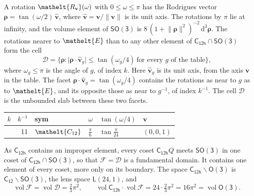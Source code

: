 \documentclass[10pt,a4paper]{article}
\numberwithin{equation}{section}
\newcommand{\eltfont}[1]{{\let\sigma\eltsigma\mathelt{#1}}}
\newcommand{\grp}[1]{\mathsf{#1}}
\newcommand{\cls}[1]{\eltfont{#1}}
\newcommand{\elt}[1]{\eltfont{#1}}
\newcommand{\dirvec}[3]{(#1, #2, #3)}
\newcommand{\unitaxis}{\hat{\mathbf{v}}}
\newcommand{\vv}{\mathbf{v}}
\newcommand{\diff}{\mathrm{d}}
\newcommand{\vol}{\operatorname{vol}}
\newcommand{\rodrigues}{\boldsymbol{\rho}}
\newcommand{\fcell}{\mathcal{D}}
\newcommand{\fdomain}{\mathcal{F}}
\newcommand{\lensspace}[2]{\mathsf{L}(#1, #2)}
\begin{document}
\leavevmode\label{n:vector.rodrigues}\label{n:vector.unitaxis}A rotation $\elt{R_{\vv}}(\omega)$ with $0 \le \omega \le \pi$ has the Rodrigues vector $\rodrigues = \tan(\omega/2)\,\unitaxis$, where $\unitaxis = \vv/\lVert\vv\rVert$ is its unit axis. The rotations by $\pi$ lie at infinity, and the volume element of \href{SO3.pdf}{$\grp{SO(3)}$} is $8\,(1 + \lVert\rodrigues\rVert^2)^{-2}\,\diff^3\rodrigues$.
\leavevmode\label{n:set.cell}The rotations nearer to $\elt{E}$ than to any other element of $\grp{C_{12h}} \cap \grp{SO(3)}$ form the cell
\begin{equation}\label{e:cell}\fcell = \bigl\{\rodrigues : \lvert\rodrigues\cdot\unitaxis_g\rvert \le \tan(\omega_g/4)\ \text{for every $g$ of the table}\bigr\},\end{equation}
where $\omega_g \le \pi$ is the angle of $g$, of index $k$. Here $\unitaxis_g$ is its unit axis, from the axis $\vv$ in the table. The facet $\rodrigues\cdot\unitaxis_g = \tan(\omega_g/4)$ contains the rotations as near to $g$ as to $\elt{E}$, and its opposite those as near to $g^{-1}$, of index $k^{-1}$. The cell $\fcell$ is the unbounded slab between these two facets.
{\small{\renewcommand{\arraystretch}{1.3}\begin{longtable}{@{}rrllll@{}}\toprule
$k$ & $k^{-1}$ & sym & $\omega$ & $\tan(\omega/4)$ & $\vv$\\\midrule\endhead
\bottomrule\endfoot\endlastfoot
1 & 11 & $\cls{C_{12}}$ & $\tfrac{\pi}{6}$ & $\tan\tfrac{\pi}{24}$ & $\dirvec{0}{0}{1}$\\
\bottomrule\end{longtable}}}

\leavevmode\label{n:set.fundamental}As $\grp{C_{12h}}$ contains an improper element, every coset $\grp{C_{12h}}Q$ meets \href{SO3.pdf}{$\grp{SO(3)}$} in one coset of $\grp{C_{12h}} \cap \grp{SO(3)}$, so that $\fdomain = \fcell$ is a fundamental domain. It contains one element of every coset, more only on its boundary.
\leavevmode\label{n:set.lens}The space $\grp{C_{12h}}\backslash\grp{O(3)}$ is $\grp{C_{12}}\backslash\grp{SO(3)}$, the lens space $\lensspace{24}{1}$, and
\begin{equation}\label{e:volume}\vol\fdomain = \vol\fcell = \tfrac{2}{3}\pi^2,\qquad \vol\grp{C_{12h}}\cdot\vol\fdomain = 24\cdot \tfrac{2}{3}\pi^2 = 16\pi^2 = \vol\grp{O(3)}.\end{equation}
\end{document}
